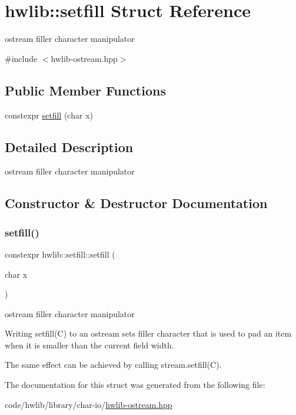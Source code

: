 \hypertarget{structhwlib_1_1setfill}{}\section{hwlib\+:\+:setfill Struct Reference}
\label{structhwlib_1_1setfill}


ostream filler character manipulator  




{\ttfamily \#include $<$hwlib-\/ostream.\+hpp$>$}

\subsection*{Public Member Functions}
\begin{DoxyCompactItemize}
\item 
constexpr \hyperlink{structhwlib_1_1setfill_a42ba50078ab62623475986d0f7ab4545}{setfill} (char x)
\end{DoxyCompactItemize}


\subsection{Detailed Description}
ostream filler character manipulator 

\subsection{Constructor \& Destructor Documentation}
\mbox{\label{structhwlib_1_1setfill_a42ba50078ab62623475986d0f7ab4545}} 
\subsubsection{\texorpdfstring{setfill()}{setfill()}}
{\footnotesize\ttfamily constexpr hwlib\+::setfill\+::setfill (\begin{DoxyParamCaption}\item[{char}]{x }\end{DoxyParamCaption})\hspace{0.3cm}{\ttfamily [inline]}}

ostream filler character manipulator

Writing setfill(\+C) to an ostream sets filler character that is used to pad an item when it is smaller than the current field width.

The same effect can be achieved by calling stream.\+setfill(\+C). 

The documentation for this struct was generated from the following file\+:\begin{DoxyCompactItemize}
\item 
code/hwlib/library/char-\/io/\hyperlink{hwlib-ostream_8hpp}{hwlib-\/ostream.\+hpp}\end{DoxyCompactItemize}
